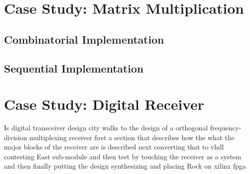 \documentclass[]{book}
\begin{document}
\chapter{Case Study: Matrix Multiplication}
\section{Combinatorial Implementation}
\section{Sequential Implementation}

%
\chapter{Case Study: Digital Receiver}
Is digital transceiver design city walks to the design of a orthogonal frequency-division multiplexing receiver first a section that describes how the what the major blocks of the receiver are is described next converting that to vhdl contesting East sub-module and then test by touching the receiver as a system and then finally putting the design synthesizing and placing Rock on xilinx fpga
\end{document}
